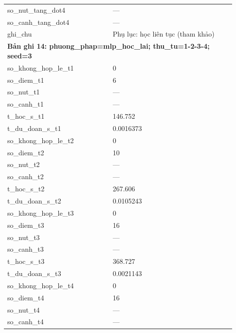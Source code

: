 \begin{longtable}{p{0.43\linewidth}p{0.50\linewidth}}
so\_\allowbreak nut\_\allowbreak tang\_\allowbreak dot4 & — \\
so\_\allowbreak canh\_\allowbreak tang\_\allowbreak dot4 & — \\
ghi\_\allowbreak chu & Phụ lục: học liên tục (tham khảo) \\
\midrule
\multicolumn{2}{p{0.95\linewidth}}{\textbf{Bản ghi 14: phuong\_phap=mlp\_hoc\_lai; thu\_tu=1-2-3-4; seed=3}} \\
so\_\allowbreak khong\_\allowbreak hop\_\allowbreak le\_\allowbreak t1 & 0 \\
so\_\allowbreak diem\_\allowbreak t1 & 6 \\
so\_\allowbreak nut\_\allowbreak t1 & — \\
so\_\allowbreak canh\_\allowbreak t1 & — \\
t\_\allowbreak hoc\_\allowbreak s\_\allowbreak t1 & 146.752 \\
t\_\allowbreak du\_\allowbreak doan\_\allowbreak s\_\allowbreak t1 & 0.0016373 \\
so\_\allowbreak khong\_\allowbreak hop\_\allowbreak le\_\allowbreak t2 & 0 \\
so\_\allowbreak diem\_\allowbreak t2 & 10 \\
so\_\allowbreak nut\_\allowbreak t2 & — \\
so\_\allowbreak canh\_\allowbreak t2 & — \\
t\_\allowbreak hoc\_\allowbreak s\_\allowbreak t2 & 267.606 \\
t\_\allowbreak du\_\allowbreak doan\_\allowbreak s\_\allowbreak t2 & 0.0105243 \\
so\_\allowbreak khong\_\allowbreak hop\_\allowbreak le\_\allowbreak t3 & 0 \\
so\_\allowbreak diem\_\allowbreak t3 & 16 \\
so\_\allowbreak nut\_\allowbreak t3 & — \\
so\_\allowbreak canh\_\allowbreak t3 & — \\
t\_\allowbreak hoc\_\allowbreak s\_\allowbreak t3 & 368.727 \\
t\_\allowbreak du\_\allowbreak doan\_\allowbreak s\_\allowbreak t3 & 0.0021143 \\
so\_\allowbreak khong\_\allowbreak hop\_\allowbreak le\_\allowbreak t4 & 0 \\
so\_\allowbreak diem\_\allowbreak t4 & 16 \\
so\_\allowbreak nut\_\allowbreak t4 & — \\
so\_\allowbreak canh\_\allowbreak t4 & — \\

\end{longtable}
